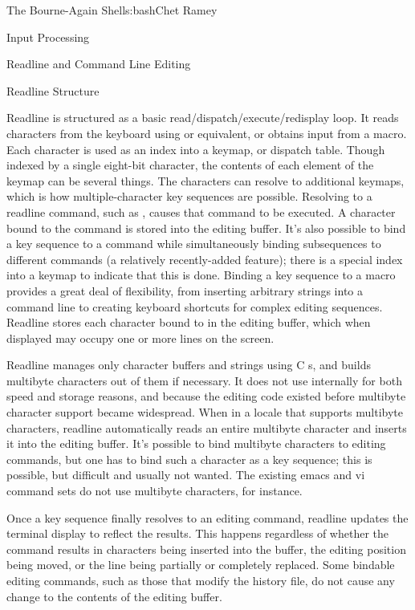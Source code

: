 \begin{aosachapter}{The Bourne-Again Shell}{s:bash}{Chet Ramey}
\begin{aosasect1}{Input Processing}
\begin{aosasect2}{Readline and Command Line Editing}
\begin{aosasect3}{Readline Structure}

Readline is structured as a basic read/dispatch/execute/redisplay
loop.  It reads characters from the keyboard using  or
equivalent, or obtains input from a macro.  Each character is used as
an index into a keymap, or dispatch table.  Though indexed by a single
eight-bit character, the contents of each element of the keymap can be
several things.  The characters can resolve to additional keymaps,
which is how multiple-character key sequences are possible.  Resolving
to a readline command, such as , causes that
command to be executed.
A character bound to the  command is stored into the
editing buffer.
It's also possible to bind a key sequence to
a command while simultaneously binding subsequences to different
commands (a relatively recently-added feature); there is a special
index into a keymap to indicate that this is done.  Binding a key
sequence to a macro provides a great deal of flexibility, from
inserting arbitrary strings into a command line to creating
keyboard shortcuts for complex editing sequences.  Readline stores
each character bound to  in the
editing buffer, which when displayed may occupy one or more lines on
the screen.

Readline manages only character buffers and strings using C
s, and builds multibyte characters out of them if
necessary.  It does not use  internally for both speed
and storage reasons, and because the editing code existed before
multibyte character support became widespread.  When in a locale that
supports multibyte characters, readline automatically reads an entire
multibyte character and inserts it into the editing buffer.  It's
possible to bind multibyte characters to editing commands, but one has
to bind such a character as a key sequence; this is possible, but
difficult and usually not wanted.  The existing emacs and vi command
sets do not use multibyte characters, for instance.

Once a key sequence finally resolves to an editing command,
readline updates the terminal display to reflect the
results.
This happens regardless of whether the command
results in characters being inserted into the buffer, the editing
position being moved, or the line being partially or completely
replaced.
Some bindable editing commands, such as those that modify
the history file, do not cause any change to the contents of the
editing buffer.


\end{aosasect3}
\end{aosasect2}
\end{aosasect1}
\end{aosachapter}
